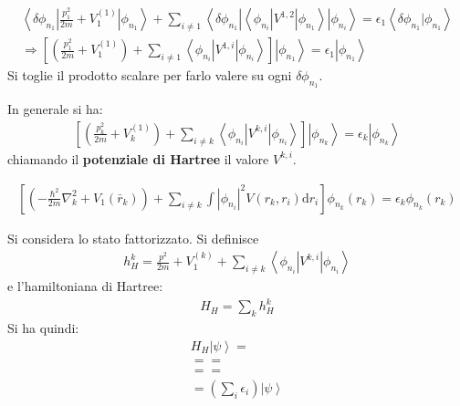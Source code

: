 \begin{equation}\begin{split}
\left\langle \delta\phi_{n_1}\right |\frac{p_1^2}{2m}+V_1^{\left(1\right)}\left |\phi_{n_1} \right\rangle+\sum_{i\neq 1}{\left\langle \delta\phi_{n_1}\right |\left\langle \phi_{n_i}\right |V^{1,2}\left |\phi_{n_1} \right\rangle\left |\phi_{n_i} \right\rangle}=\epsilon_1\left\langle \delta\phi_{n_1}|\phi_{n_1} \right\rangle\\
\Longrightarrow \left[\left(\frac{p_1^2}{2m}+V_1^{\left(1\right)}\right)+\sum_{i\neq 1}{\left\langle \phi_{n_i}\right |V^{1,i}\left |\phi_{n_i} \right\rangle}\right]\left |\phi_{n_1} \right\rangle=\epsilon_1\left |\phi_{n_1} \right\rangle
\end{split}\end{equation}
Si toglie il prodotto scalare per farlo valere su ogni $\delta\phi_{n_1}$.

In generale si ha:
\begin{equation}\begin{split}
\left[\left(\frac{p_k^2}{2m}+V_k^{\left(1\right)}\right)+\sum_{i\neq k}{\left\langle \phi_{n_i}\right |V^{k,i}\left |\phi_{n_i} \right\rangle}\right]\left |\phi_{n_k} \right\rangle=\epsilon_k\left |\phi_{n_k} \right\rangle
\end{split}\end{equation}
chiamando il \textbf{potenziale di Hartree} il valore $V^{k,i}$.

\begin{equation}\begin{split}
\left[\left(-\frac{\hbar ^2}{2m}\nabla _k^2+V_1\left(\bar r_k\right)\right)+\sum_{i\neq k}{\int{\left|\phi_{n_i}\right|^2V\left(r_k,r_i\right)\textrm{d}r_i}}\right]\phi_{n_k}\left(r_k\right)=\epsilon_k\phi_{n_k}\left(r_k\right)
\end{split}\end{equation}


Si considera lo stato fattorizzato. Si definisce
\begin{equation}\begin{split}
h_H^{k}=\frac{p ^2}{2m}+V_1^{\left(k\right)}+\sum_{i\neq k}{\left\langle \phi_{n_i}\right |V^{k,i}\left |\phi_{n_i} \right\rangle}
\end{split}\end{equation}
e l'hamiltoniana di Hartree:
\begin{equation}\begin{split}
H_H=\sum_k{h_H^{k}}
\end{split}\end{equation}
Si ha quindi:
\begin{equation}\begin{split}
H_H\left |\psi  \right\rangle=\\
= =\\
= =\\
=\left(\sum_i{\epsilon_i}\right)\left |\psi  \right\rangle
\end{split}\end{equation}

